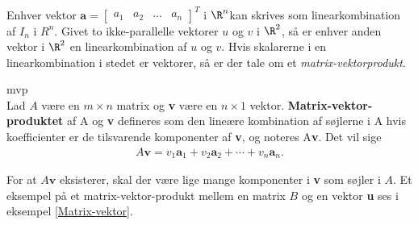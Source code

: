 Enhver vektor 
$
\textbf{a}=
\begin{bmatrix}
a_1 & a_2 & \ldots & a_n
\end{bmatrix}^T
$
i $\R^n$kan skrives som linearkombination af $I_n$ i $R^n$. 
Givet to ikke-parallelle vektorer $u$ og $v$ i $\R^2$, så er enhver anden vektor i $\R^2$ en linearkombination af $u$ og $v$. 
Hvis skalarerne i en linearkombination i stedet er vektorer, så er der tale om et \textit{matrix-vektorprodukt}.

\begin{defn}{}{mvp}
\phantom{gdfs}\\Lad $A$ være en $m \times n$ matrix og \textbf{v} være en $n \times 1$ vektor. \textbf{Matrix-vektor-produktet} af A og \textbf{v} defineres som den lineære kombination af søjlerne i A hvis koefficienter er de tilsvarende komponenter af \textbf{v}, og noteres A\textbf{v}. Det vil sige
\begin{align*}
A\textbf{v} =v_1\textbf{a}_1 + v_2\textbf{a}_2 + \cdots + v_n\textbf{a}_n.
\end{align*}
\end{defn}
\noindent
For at $A\textbf{v}$ eksisterer, skal der være lige mange komponenter i \textbf{v} som søjler i $A$. Et eksempel på et matrix-vektor-produkt mellem en matrix $B$ og en vektor \textbf{u} ses i eksempel \ref{Matrix-vektor}.
